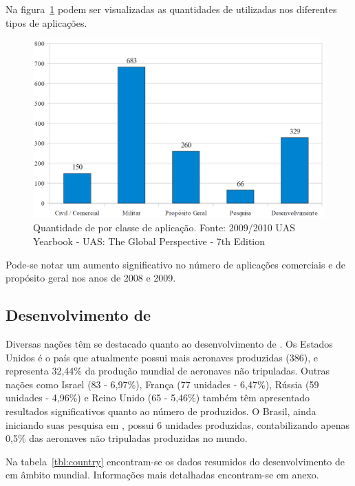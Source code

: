 Na figura~\ref{fig:qt_uav_app} podem ser visualizadas as quantidades de \vants utilizadas nos diferentes tipos de aplicações.

\begin{figure}[h!]
\centering
\includegraphics[width=13cm]{pictures/qt_uavs_app.png}
\caption{Quantidade de \vants por classe de aplicação. Fonte: 2009/2010 UAS Yearbook - UAS: The Global Perspective - 7th Edition}
 \label{fig:qt_uav_app}
\end{figure}

Pode-se notar um aumento significativo no número de aplicações comerciais e de propósito geral nos anos de 2008 e 2009.

\subsection{Desenvolvimento de \vants}

Diversas nações têm se destacado quanto ao desenvolvimento de \vants. Os Estados Unidos é o país que atualmente possui mais aeronaves produzidas (386), e representa 32,44\% da
produção mundial de aeronaves não tripuladas. Outras nações como Israel (83 - 6,97\%),  França (77 unidades - 6,47\%), Rússia (59 unidades - 4,96\%) e Reino Unido (65 - 5,46\%) também têm apresentado resultados significativos quanto ao número de \vants produzidos. O Brasil, ainda iniciando suas pesquisa em \vants, possui 6 unidades produzidas, contabilizando apenas 0,5\% das aeronaves não tripuladas produzidas no mundo.

Na tabela~\ref{tbl:country} encontram-se os dados resumidos do desenvolvimento de \vants em âmbito mundial. Informações mais detalhadas encontram-se em anexo.

